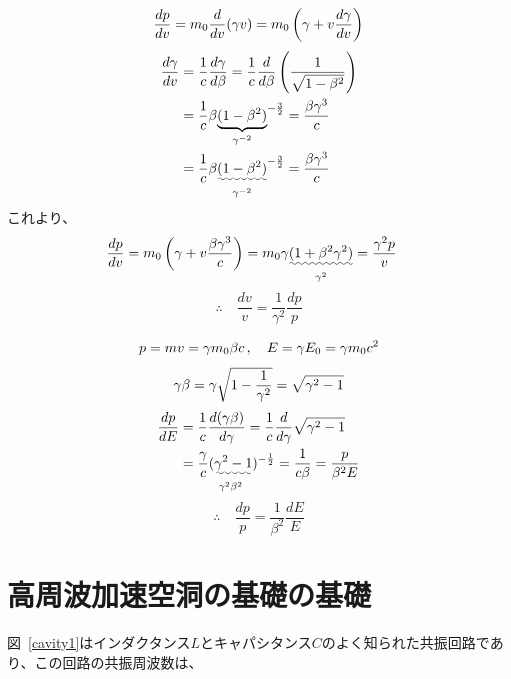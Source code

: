 \documentclass[10pt,a4paper]{ltjsarticle}
\begin{document}
\begin{equation}
    \frac{dp}{dv} = m_0\frac{d}{dv}(\gamma v)
    = m_0 \left(\gamma + v \frac{d\gamma}{dv}\right) \notag
\end{equation}
%
\begin{align}
    \frac{d\gamma}{dv} & = \frac{1}{c}\frac{d\gamma}{d\beta}= \frac{1}{c}\frac{d}{d\beta}\left(\frac{1}{\sqrt{1-\beta^2}}\right) \notag \\
    & = \frac{1}{c} \beta \underset{\gamma^{-2}}{\underbrace{(1-\beta^2)}}^{-\frac{3}{2}} = \frac{\beta \gamma^3}{c} \notag \\
    & = \frac{1}{c} \beta \underset{\gamma^{-2}}{\uwave{(1-\beta^2)}}^{-\frac{3}{2}} = \frac{\beta \gamma^3}{c} \notag
\end{align}
%
これより、
\begin{align}
    \frac{dp}{dv} & = m_0 \left(\gamma + v \frac{\beta \gamma^3}{c}\right)
    = m_0 \gamma \underset{\gamma^2}{\uwave{(1 + \beta^2 \gamma^2)}}
    = \frac{\gamma^2 p}{v} \notag
\end{align}
%
\begin{equation}
    \therefore \quad \frac{dv}{v} = \frac{1}{\gamma^2}\frac{dp}{p}
    \label{dv_dp}
\end{equation}

\begin{align}
    p = mv = \gamma m_0 \beta c\,  , \quad E = \gamma E_0 = \gamma m_0 c^2 \notag
\end{align}
%
\begin{equation}
    \gamma \beta = \gamma \sqrt{1-\frac{1}{\gamma^2}} \notag = \sqrt{\gamma^2 -1} \notag
\end{equation}
%
\begin{align}
    \frac{dp}{dE} & = \frac{1}{c}\frac{d(\gamma \beta)}{d\gamma} = \frac{1}{c}\frac{d}{d\gamma}\sqrt{\gamma^2 -1} \notag \\
    & = \frac{\gamma}{c} \underset{\gamma^2\beta^2}{(\uwave{\gamma^2 -1}})^{-\frac{1}{2}} = \frac{1}{c\beta}
    = \frac{p}{\beta^2 E}\notag
\end{align}
%
\begin{equation}
    \therefore \quad \frac{dp}{p} = \frac{1}{\beta^2}\frac{dE}{E}
\end{equation}

\section{高周波加速空洞の基礎の基礎}
図~\ref{cavity1}はインダクタンス$L$とキャパシタンス$C$のよく知られた共振回路であり、この回路の共振周波数は、
\end{document}
